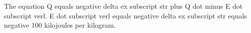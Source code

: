 The equation Q equals negative delta ex subscript str plus Q dot minus E dot subscript verl. E dot subscript verl equals negative delta ex subscript str equals negative 100 kilojoules per kilogram.